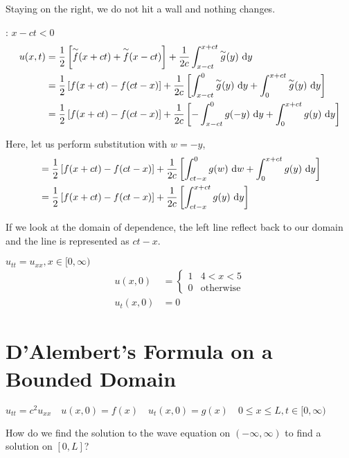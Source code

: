 Staying on the right, we do not hit a wall and nothing changes.

: $x - ct < 0$
%
\begin{align}
  u(x, t)
  & = \frac{1}{2} \left[ \overset{\sim}{f}(x + ct) + \overset{\sim}{f}(x - ct) \right] +
  \frac{1}{2c} \int^{x + ct}_{x - ct} \overset{\sim}{g}(y)\ \text dy\\
  & = \frac{1}{2} \left[ f(x + ct) - f(ct - x) \right] +
  \frac{1}{2c}
  \left[
  \int^{0}_{x - ct} \overset{\sim}{g}(y)\ \text dy +
  \int^{x + ct}_{0} \overset{\sim}{g}(y)\ \text dy
   \right]\\
   & = \frac{1}{2} \left[ f(x + ct) - f(ct - x) \right] +
   \frac{1}{2c}
   \left[
   -\int^{0}_{x - ct} g(-y)\ \text dy +
   \int^{x + ct}_{0} g(y)\ \text dy
    \right]
\end{align}

Here, let us perform substitution with $w = -y$,
%
\begin{align}
  & = \frac{1}{2} \left[ f(x + ct) - f(ct - x) \right] +
  \frac{1}{2c}
  \left[
  \int^{0}_{ct - x} g(w)\ \text dw +
  \int^{x + ct}_{0} g(y)\ \text dy
  \right]\\
  & = \frac{1}{2} \left[ f(x + ct) - f(ct - x) \right] +
  \frac{1}{2c}
  \left[
  \int^{x + ct}_{ct - x} g(y)\ \text dy
  \right]
\end{align}

If we look at the domain of dependence, the left line reflect back to our domain and the line is represented as $ct - x$.

\ex $u_{tt} = u_{xx}, x \in [0, \infty)$
%
\begin{align}
  u(x, 0) & =
  \begin{cases}
    1 & 4 < x < 5\\
    0 & \text{otherwise}
  \end{cases}\\
  u_t(x, 0) & = 0
\end{align}

\section{D'Alembert's Formula on a Bounded Domain}
\begin{center}
  $
  u_{tt} = c^2 u_{xx} \quad
  u(x, 0) = f(x) \quad
  u_t(x, 0) = g(x) \quad
  0 \leq x \leq L, t \in [0, \infty)
  $
\end{center}

How do we find the solution to the wave equation on
$(-\infty, \infty)$
to find a solution on $[0, L]$?

